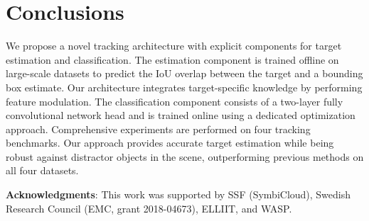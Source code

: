 \documentclass[10pt,twocolumn,letterpaper]{article}
\begin{document}
\begin{table}[t]
	\centering
	\vspace{1mm}\caption{State-of-the-art comparison on the public VOT2018 dataset in terms of expected average overlap (EAO), robustness (tracking failure), and accuracy. Our tracker outperforms all the previous methods in terms of EAO.}\label{tab:vot_sota}\vspace{-3mm}
\end{table}


 \section{Conclusions} 
We propose a novel tracking architecture with explicit components for target estimation and classification. The estimation component is trained offline on large-scale datasets to predict the IoU overlap between the target and a bounding box estimate. Our architecture integrates target-specific knowledge by performing feature modulation. The classification component consists of a two-layer fully convolutional network head and is trained online using a dedicated optimization approach. Comprehensive experiments are performed on four tracking benchmarks. Our approach provides accurate target estimation while being robust against distractor objects in the scene, outperforming previous methods on all four datasets. 
 
\noindent\textbf{Acknowledgments}:
This work was supported by  SSF (SymbiCloud), Swedish Research Council (EMC, grant 2018-04673), ELLIIT, and WASP.
\end{document}
